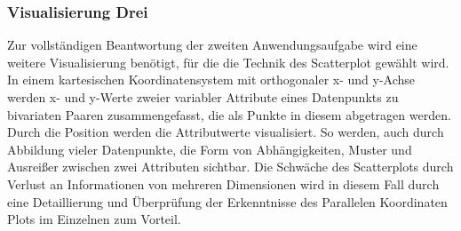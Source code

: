 \documentclass[usegeometry=true]{scrartcl}
\begin{document}




\subsubsection{Visualisierung Drei}
Zur vollständigen Beantwortung der zweiten Anwendungsaufgabe wird eine weitere Visualisierung benötigt, für die die Technik des Scatterplot gewählt wird.
In einem kartesischen Koordinatensystem mit orthogonaler x- und y-Achse werden x- und y-Werte zweier variabler Attribute eines Datenpunkts zu bivariaten Paaren zusammengefasst, die als Punkte in diesem abgetragen werden.
Durch die Position werden die Attributwerte visualisiert.\cite[103]{Friendly.2005}
So werden, auch durch Abbildung vieler Datenpunkte, die Form von Abhängigkeiten, Muster und Ausreißer zwischen zwei Attributen sichtbar.\cite[9]{Chan.2006} \cite[103]{Friendly.2005}
Die Schwäche des Scatterplots durch Verlust an Informationen von mehreren Dimensionen wird in diesem Fall durch eine Detaillierung und Überprüfung der Erkenntnisse des Parallelen Koordinaten Plots im Einzelnen zum Vorteil.\cite[9]{Chan.2006} \cite[93]{Wegman.1997}
\end{document}
